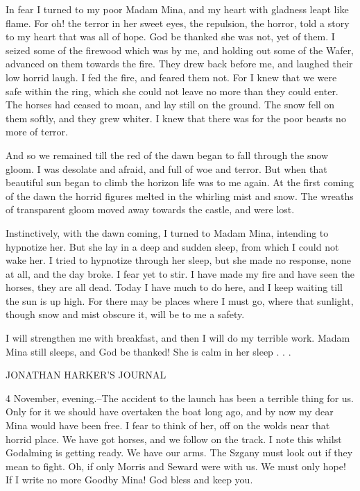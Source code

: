 In fear I turned to my poor Madam Mina, and my heart with gladness leapt like flame. For oh! the terror in her sweet eyes, the repulsion, the horror, told a story to my heart that was all of hope. God be thanked she was not, yet of them. I seized some of the firewood which was by me, and holding out some of the Wafer, advanced on them towards the fire. They drew back before me, and laughed their low horrid laugh. I fed the fire, and feared them not. For I knew that we were safe within the ring, which she could not leave no more than they could enter. The horses had ceased to moan, and lay still on the ground. The snow fell on them softly, and they grew whiter. I knew that there was for the poor beasts no more of terror. 

And so we remained till the red of the dawn began to fall through the snow gloom. I was desolate and afraid, and full of woe and terror. But when that beautiful sun began to climb the horizon life was to me again. At the first coming of the dawn the horrid figures melted in the whirling mist and snow. The wreaths of transparent gloom moved away towards the castle, and were lost. 

Instinctively, with the dawn coming, I turned to Madam Mina, intending to hypnotize her. But she lay in a deep and sudden sleep, from which I could not wake her. I tried to hypnotize through her sleep, but she made no response, none at all, and the day broke. I fear yet to stir. I have made my fire and have seen the horses, they are all dead. Today I have much to do here, and I keep waiting till the sun is up high. For there may be places where I must go, where that sunlight, though snow and mist obscure it, will be to me a safety. 

I will strengthen me with breakfast, and then I will do my terrible work. Madam Mina still sleeps, and God be thanked! She is calm in her sleep . . . 

JONATHAN HARKER'S JOURNAL 

4 November, evening.--The accident to the launch has been a terrible thing for us. Only for it we should have overtaken the boat long ago, and by now my dear Mina would have been free. I fear to think of her, off on the wolds near that horrid place. We have got horses, and we follow on the track. I note this whilst Godalming is getting ready. We have our arms. The Szgany must look out if they mean to fight. Oh, if only Morris and Seward were with us. We must only hope! If I write no more Goodby Mina! God bless and keep you. 

